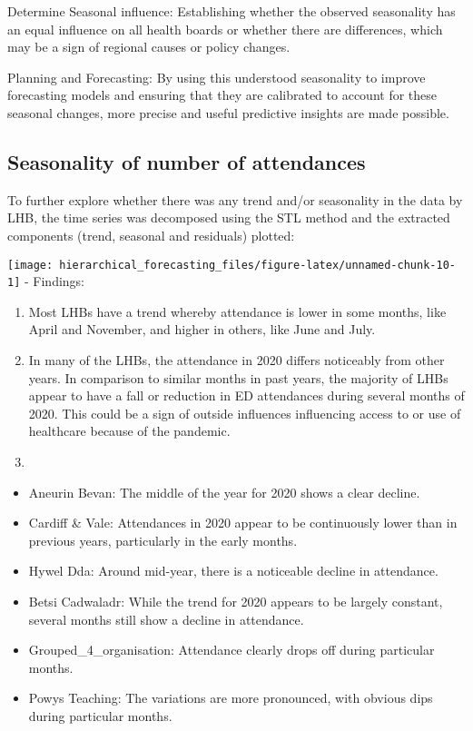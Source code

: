 \documentclass[
]{article}
\providecommand{\tightlist}{%
  \setlength{\itemsep}{0pt}\setlength{\parskip}{0pt}}
\begin{document}
Determine Seasonal influence:
Establishing whether the observed seasonality has an equal influence on all health boards or whether there are differences, which may be a sign of regional causes or policy changes.

Planning and Forecasting:
By using this understood seasonality to improve forecasting models and ensuring that they are calibrated to account for these seasonal changes, more precise and useful predictive insights are made possible.

\newpage

\hypertarget{seasonality-of-number-of-attendances}{%
\subsection{Seasonality of number of attendances}\label{seasonality-of-number-of-attendances}}

To further explore whether there was any trend and/or seasonality in the data by LHB, the time series was decomposed using the STL method and the extracted components (trend, seasonal and residuals) plotted:

\texttt{[image: hierarchical\_forecasting\_files/figure-latex/unnamed-chunk-10-1]}
- Findings:

\begin{enumerate}
\def\labelenumi{\arabic{enumi}.}
\item
  Most LHBs have a trend whereby attendance is lower in some months, like April and November, and higher in others, like June and July.
\item
  In many of the LHBs, the attendance in 2020 differs noticeably from other years.
  In comparison to similar months in past years, the majority of LHBs appear to have a fall or reduction in ED attendances during several months of 2020. This could be a sign of outside influences influencing access to or use of healthcare because of the pandemic.
\item
\end{enumerate}

\begin{itemize}
\tightlist
\item
  Aneurin Bevan: The middle of the year for 2020 shows a clear decline.
\item
  Cardiff \& Vale: Attendances in 2020 appear to be continuously lower than in previous years, particularly in the early months.
\item
  Hywel Dda: Around mid-year, there is a noticeable decline in attendance.
\item
  Betsi Cadwaladr: While the trend for 2020 appears to be largely constant, several months still show a decline in attendance.
\item
  Grouped\_4\_organisation: Attendance clearly drops off during particular months.
\item
  Powys Teaching: The variations are more pronounced, with obvious dips during particular months.
\end{itemize}
\end{document}
